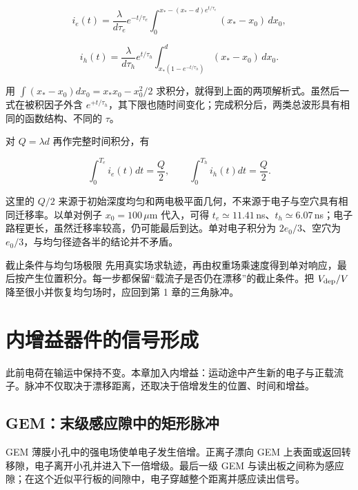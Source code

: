 \documentclass[
  11pt,
  a4paper,
  oneside,
  openany]{report}
\numberwithin{equation}{chapter}
\begin{document}
\begin{equation}
i_e(t)=\frac{\lambda}{d\tau_e}e^{-t/\tau_e}
\int_0^{x_\ast-(x_\ast-d)e^{t/\tau_e}}(x_\ast-x_0)\,dx_0,
\end{equation}

\begin{equation}
i_h(t)=\frac{\lambda}{d\tau_h}e^{t/\tau_h}
\int_{x_\ast(1-e^{-t/\tau_h})}^{d}(x_\ast-x_0)\,dx_0.
\end{equation}

用 \(\int(x_\ast-x_0)dx_0=x_\ast x_0-x_0^2/2\)
求积分，就得到上面的两项解析式。虽然后一式在被积因子外含
\(e^{+t/\tau_h}\)，其下限也随时间变化；完成积分后，两类总波形具有相同的函数结构、不同的
\(\tau\)。

对 \(Q=\lambda d\) 再作完整时间积分，有

\begin{equation}
\int_0^{T_e}i_e(t)dt=\frac Q2,\qquad
\int_0^{T_h}i_h(t)dt=\frac Q2.
\end{equation}

这里的 \(Q/2\)
来源于初始深度均匀和两电极平面几何，不来源于电子与空穴具有相同迁移率。以单对例子
\(x_0=100\,\mu\)m 代入，可得
\(t_e\simeq11.41\,\)ns、\(t_h\simeq6.07\,\)ns；电子路程更长，虽然迁移率较高，仍可能最后到达。单对电子积分为
\(2e_0/3\)、空穴为 \(e_0/3\)，与均匀径迹各半的结论并不矛盾。

\begin{notebox}{截止条件与均匀场极限}
先用真实场求轨迹，再由权重场乘速度得到单对响应，最后按产生位置积分。每一步都保留“载流子是否仍在漂移”的截止条件。把 $V_{\rm dep}/V$ 降至很小并恢复均匀场时，应回到第 1 章的三角脉冲。
\end{notebox}

\endgroup

\chapter{内增益器件的信号形成}\label{ux5185ux589eux76caux5668ux4ef6ux7684ux4fe1ux53f7ux5f62ux6210}

此前电荷在输运中保持不变。本章加入内增益：运动途中产生新的电子与正载流子。脉冲不仅取决于漂移距离，还取决于倍增发生的位置、时间和增益。

\section{GEM：末级感应隙中的矩形脉冲}\label{gemux672bux7ea7ux611fux5e94ux9699ux4e2dux7684ux77e9ux5f62ux8109ux51b2}

GEM 薄膜小孔中的强电场使单电子发生倍增。正离子漂向 GEM
上表面或返回转移隙，电子离开小孔并进入下一倍增级。最后一级 GEM
与读出板之间称为感应隙；在这个近似平行板的间隙中，电子穿越整个距离并感应读出信号。
\end{document}
